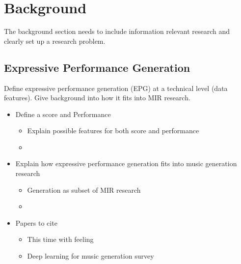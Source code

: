 \chapter{Background}\label{ch:ch2}
The background section needs to include information relevant research and clearly set up a research problem. 

\section{Expressive Performance Generation}
Define expressive performance generation (EPG) at a technical level (data features). Give background into how it fits into MIR research. 
\begin{itemize}
    \item Define a score and Performance
    \begin{itemize}
        \item Explain possible features for both score and performance
        \item {}
    \end{itemize}
    \item Explain how expressive performance generation fits into music generation research
    \begin{itemize}
        \item Generation as subset of MIR research 
        \item {}
    \end{itemize}
    \item Papers to cite 
    \begin{itemize}
        \item This time with feeling \cite{oore2020time}
        \item Deep learning for music generation survey \cite{ji2020comprehensive}
    \end{itemize}
\end{itemize}


